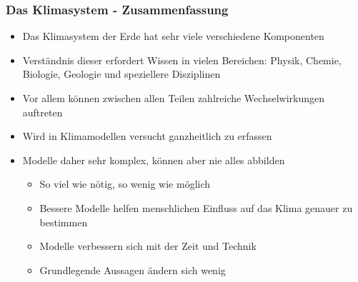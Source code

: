 \begin{frame}
	\frametitle{Das Klimasystem - Zusammenfassung}
	
	\begin{itemize}
		\item Das Klimasystem der Erde hat sehr viele verschiedene Komponenten
		\item Verständnis dieser erfordert Wissen in vielen Bereichen: Physik, Chemie, Biologie, Geologie und speziellere Disziplinen
		\item Vor allem können zwischen allen Teilen zahlreiche Wechselwirkungen auftreten
		\item Wird in Klimamodellen versucht ganzheitlich zu erfassen
		\item Modelle daher sehr komplex, können aber nie alles abbilden
		\begin{itemize}
			\item So viel wie nötig, so wenig wie möglich
			\item Bessere Modelle helfen menschlichen Einfluss auf das Klima genauer zu bestimmen
			\item Modelle verbessern sich mit der Zeit und Technik
			\item Grundlegende Aussagen ändern sich wenig
		\end{itemize}

	\end{itemize}
	
	\note{
		\begin{itemize}
			\item[] 
		\end{itemize}
	}
\end{frame}
